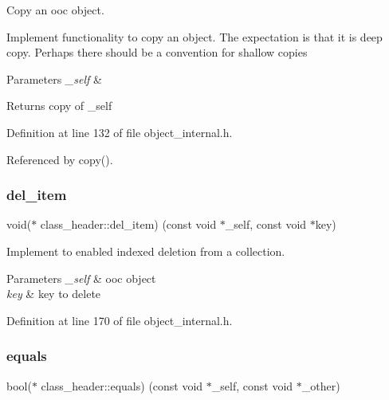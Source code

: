Copy an ooc object.

Implement functionality to copy an object. The expectation is that it is deep copy. Perhaps there should be a convention for shallow copies


\begin{DoxyParams}{Parameters}
{\em \+\_\+self} & \\
\hline
\end{DoxyParams}
\begin{DoxyReturn}{Returns}
copy of \+\_\+self 
\end{DoxyReturn}


Definition at line 132 of file object\+\_\+internal.\+h.



Referenced by copy().

\mbox{\label{structclass__header_a4d88d979ecf23c184577d937454ab973}} 
\subsubsection{\texorpdfstring{del\+\_\+item}{del\_item}}
{\footnotesize\ttfamily void($\ast$ class\+\_\+header\+::del\+\_\+item) (const void $\ast$\+\_\+self, const void $\ast$key)}

Implement to enabled indexed deletion from a collection. 
\begin{DoxyParams}{Parameters}
{\em \+\_\+self} & ooc object \\
\hline
{\em key} & key to delete \\
\hline
\end{DoxyParams}


Definition at line 170 of file object\+\_\+internal.\+h.

\mbox{\label{structclass__header_a01dc6aae9011475ec7be8500d4f63c5b}} 
\subsubsection{\texorpdfstring{equals}{equals}}
{\footnotesize\ttfamily bool($\ast$ class\+\_\+header\+::equals) (const void $\ast$\+\_\+self, const void $\ast$\+\_\+other)}

